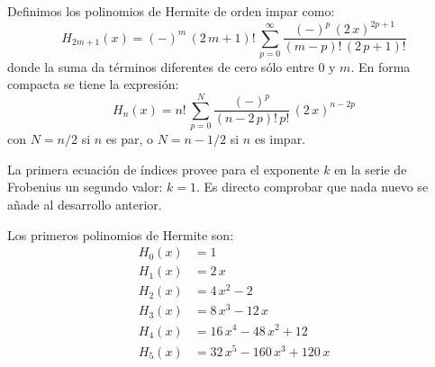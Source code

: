 Definimos los polinomios de Hermite de orden impar como:
\begin{equation}
H_{2m+1} (x) = (-)^{m} \, (2 \, m + 1)! \, \sum_{p=0}^{\infty} \dfrac{(-)^{p} \, (2 \, x)^{2p+1}}{(m-p)! \, (2 \, p + 1)!}
\label{eq:ecuacion_08_61}
\end{equation}
donde la suma da términos diferentes de cero sólo entre $0$ y $m$. En forma compacta se tiene la expresión:
\begin{equation}
\boxed{H_{n}(x) = n! \, \sum_{p=0}^{N} \dfrac{(-)^{p}}{(n - 2 \, p)! \, p!} \, (2 \, x)^{n-2p}}
\label{eq:ecuacion_08_62}
\end{equation}
con $N=n/2$ si $n$ es par, o $N=n-1/2$ si $n$ es impar.
\par
La primera ecuación de índices provee para el exponente $k$ en la serie de Frobenius un segundo valor: $k = 1$. Es directo comprobar que nada nuevo se añade al desarrollo anterior.
\par
Los primeros polinomios de Hermite son:
\begin{align*}
H_{0}(x) &= 1 \\
H_{1}(x) &= 2 \, x \\
H_{2}(x) &= 4 \, x^{2} - 2 \\
H_{3}(x) &= 8 \, x^{3} - 12 \, x \\
H_{4}(x) &= 16 \, x^{4} - 48 \, x^{2} + 12 \\
H_{5}(x) &= 32 \, x^{5} - 160 \, x^{3} + 120 \, x
\end{align*}
